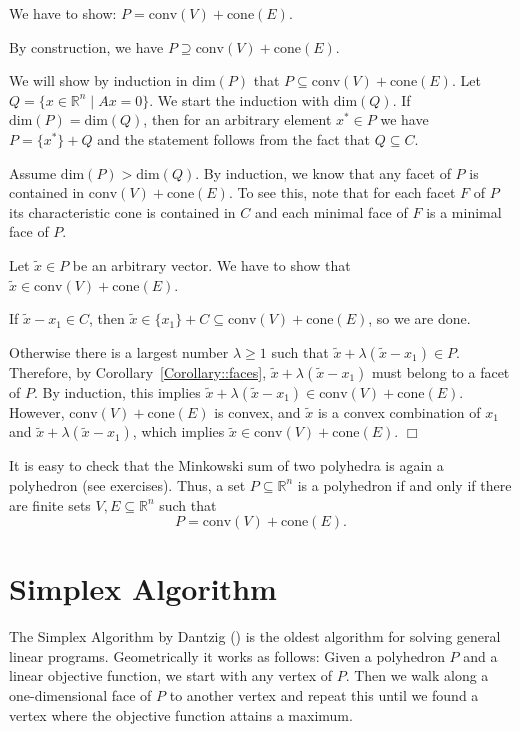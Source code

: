 \documentclass[12pt, showidx, twoside]{article}
\def\endproof{\hfill{$\Box$}}
\def\R{\mathbb{R}}
\let\oldsection\section
\def\section{\cleardoublepage\oldsection}
\begin{document}
{{{   We have to show: $P = \mbox{conv}(V) + \mbox{cone}(E)$.

   By construction, we have $P \supseteq \mbox{conv}(V) + \mbox{cone}(E)$.

   We will show by induction in $\text{dim}(P)$ that 
   $P \subseteq \mbox{conv}(V) + \mbox{cone}(E)$. 
   Let $Q = \{x \in \R^n \mid Ax = 0 \}$. We start the induction with
   $\text{dim}(Q)$.
   If $\text{dim}(P) = \text{dim}(Q)$, then for an arbitrary element
   $x^* \in P$ we have $P = \{x^*\} + Q$ and the statement follows from
   the fact that $Q \subseteq C$.

   Assume $\text{dim}(P) > \text{dim}(Q)$. By induction, we know that 
   any facet of $P$ is contained in $\mbox{conv}(V) + \mbox{cone}(E)$.
   To see this, note that for each facet $F$ of $P$ its characteristic
   cone is contained in $C$ and each minimal face of $F$ is a minimal face
   of $P$.

   Let $\tilde x \in P$ be an arbitrary vector. We have to show that
   $\tilde x \in \mbox{conv}(V) + \mbox{cone}(E)$.

   If $\tilde x - x_1 \in C$, then 
   $\tilde x \in \{x_1\} + C \subseteq \mbox{conv}(V) + \mbox{cone}(E)$,
   so we are done.

   Otherwise there is a largest number $\lambda \geq 1$ such that 
   $\tilde x + \lambda(\tilde x - x_1) \in P$. Therefore, by
   Corollary~\ref{Corollary::faces}, $\tilde x + \lambda(\tilde x - x_1)$
   must belong to a facet of $P$. By induction, this implies
   $\tilde x + \lambda(\tilde x - x_1) \in \mbox{conv}(V) + \mbox{cone}(E)$.
   However, $\mbox{conv}(V) + \mbox{cone}(E)$ is convex, and $\tilde x$
   is a convex combination of $x_1$ and $\tilde x + \lambda(\tilde x - x_1)$,
   which implies $\tilde x \in \mbox{conv}(V) + \mbox{cone}(E)$.
 \fi
\endproof

It is easy to check that the Minkowski sum of two polyhedra is again
a polyhedron (see exercises). Thus, a set $P \subseteq \R^n$ is a 
polyhedron if and only if 
there are finite sets $V,E \subseteq\R^n$ such that
\[
   P = \mbox{conv}(V) + \mbox{cone}(E).
\]




\section{Simplex Algorithm}

The {\sc Simplex Algorithm} by Dantzig (\cite{Dan51}) is the oldest algorithm for
solving general linear programs.
Geometrically it works as follows: Given a polyhedron $P$
and a linear objective function, we start with any vertex of $P$. Then we walk
along a one-dimensional face of $P$ to another vertex and repeat this until we found 
a vertex where the objective function attains a maximum.

}}}
\end{document}
